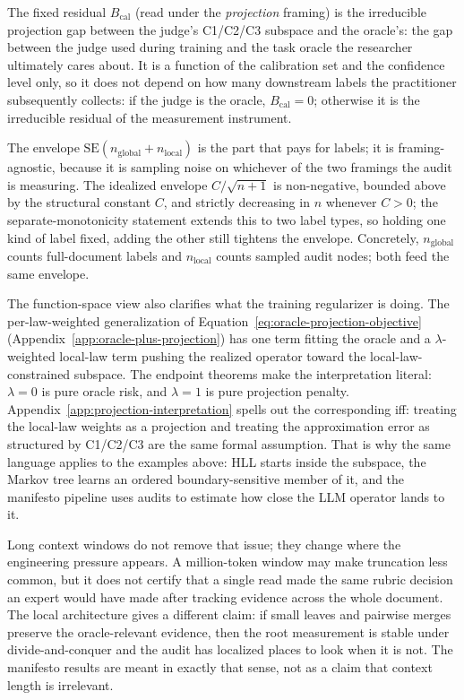 The fixed residual $B_{\mathrm{cal}}$ (read under the \emph{projection} framing) is the irreducible projection gap between the judge's C1/C2/C3 subspace and the oracle's: the gap between the judge used during training and the task oracle the researcher ultimately cares about. It is a function of the calibration set and the confidence level only, so it does not depend on how many downstream labels the practitioner subsequently collects: if the judge is the oracle, $B_{\mathrm{cal}} = 0$; otherwise it is the irreducible residual of the measurement instrument.

The envelope $\text{SE}(n_{\mathrm{global}} + n_{\mathrm{local}})$ is the part that pays for labels; it is framing-agnostic, because it is sampling noise on whichever of the two framings the audit is measuring. The idealized envelope $C / \sqrt{n+1}$ is non-negative, bounded above by the structural constant $C$, and strictly decreasing in $n$ whenever $C > 0$; the separate-monotonicity statement extends this to two label types, so holding one kind of label fixed, adding the other still tightens the envelope. Concretely, $n_{\mathrm{global}}$ counts full-document labels and $n_{\mathrm{local}}$ counts sampled audit nodes; both feed the same envelope.

The function-space view also clarifies what the training regularizer is
doing. The per-law-weighted generalization of
Equation~\eqref{eq:oracle-projection-objective}
(Appendix~\ref{app:oracle-plus-projection}) has one term fitting the
oracle and a $\lambda$-weighted local-law term pushing the realized
operator toward the local-law-constrained subspace. The endpoint theorems make the
interpretation literal: $\lambda=0$ is pure oracle risk, and $\lambda=1$
is pure projection penalty. Appendix~\ref{app:projection-interpretation}
spells out the corresponding iff: treating the local-law weights as a
projection and treating the approximation error as structured by C1/C2/C3
are the same formal assumption. That is why the same language applies to
the examples above: HLL starts inside the subspace, the Markov tree learns
an ordered boundary-sensitive member of it, and the manifesto pipeline
uses audits to estimate how close the LLM operator lands to it.

Long context windows do not remove that issue; they change where the
engineering pressure appears. A million-token window may make truncation
less common, but it does not certify that a single read made the same
rubric decision an expert would have made after tracking evidence across
the whole document. The local architecture gives a different claim: if
small leaves and pairwise merges preserve the oracle-relevant evidence,
then the root measurement is stable under divide-and-conquer and the
audit has localized places to look when it is not. The manifesto results
are meant in exactly that sense, not as a claim that context length is
irrelevant.

